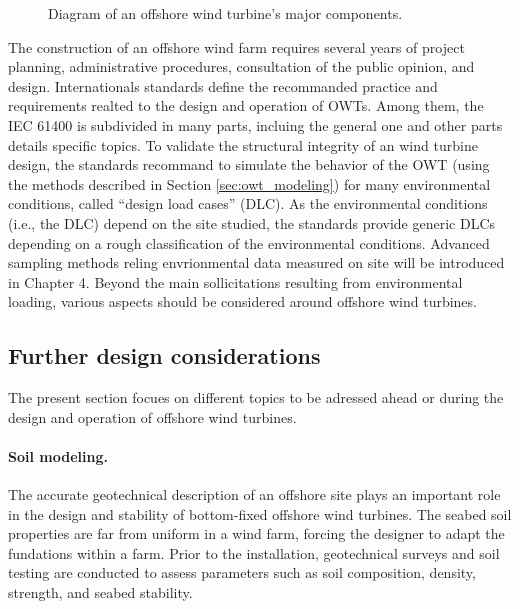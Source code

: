 \begin{figure}
    \centering
    
    \caption{Diagram of an offshore wind turbine's major components.}
    \label{fig:owt_diagram}
\end{figure}

The construction of an offshore wind farm requires several years of project planning, administrative procedures, consultation of the public opinion, and design. 
Internationals standards define the recommanded practice and requirements realted to the design and operation of OWTs. 
Among them, the IEC 61400 is subdivided in many parts, incluing the general one \citep{iec_2019} and other parts details specific topics.       
To validate the structural integrity of an wind turbine design, the standards recommand to simulate the behavior of the OWT (using the methods described in Section \ref{sec:owt_modeling}) for many environmental conditions, called ``design load cases'' (DLC). 
As the environmental conditions (i.e., the DLC) depend on the site studied, the standards provide generic DLCs depending on a rough classification of the environmental conditions. 
Advanced sampling methods reling envrionmental data measured on site will be introduced in Chapter 4. 
Beyond the main sollicitations resulting from environmental loading, various aspects should be considered around offshore wind turbines. 


\subsection{Further design considerations}
The present section focues on different topics to be adressed ahead or during the design and operation of offshore wind turbines.

\paragraph{Soil modeling.}
The accurate geotechnical description of an offshore site plays an important role in the design and stability of bottom-fixed offshore wind turbines. 
The seabed soil properties are far from uniform in a wind farm, forcing the designer to adapt the fundations within a farm. 
Prior to the installation, geotechnical surveys and soil testing are conducted to assess parameters such as soil composition, density, strength, and seabed stability. 

